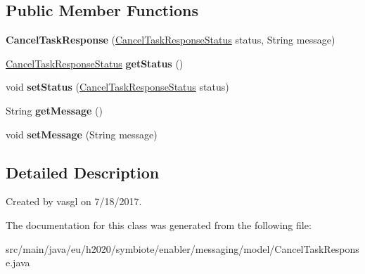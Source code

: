 \subsection*{Public Member Functions}
\begin{DoxyCompactItemize}
\item 
\mbox{\label{classeu_1_1h2020_1_1symbiote_1_1enabler_1_1messaging_1_1model_1_1CancelTaskResponse_abb332532c55c9b4129d7829049bc5703}} 
{\bfseries Cancel\+Task\+Response} (\hyperlink{enumeu_1_1h2020_1_1symbiote_1_1enabler_1_1messaging_1_1model_1_1CancelTaskResponseStatus}{Cancel\+Task\+Response\+Status} status, String message)
\item 
\mbox{\label{classeu_1_1h2020_1_1symbiote_1_1enabler_1_1messaging_1_1model_1_1CancelTaskResponse_a5aeaac8821f75f9d1b198c189c856b61}} 
\hyperlink{enumeu_1_1h2020_1_1symbiote_1_1enabler_1_1messaging_1_1model_1_1CancelTaskResponseStatus}{Cancel\+Task\+Response\+Status} {\bfseries get\+Status} ()
\item 
\mbox{\label{classeu_1_1h2020_1_1symbiote_1_1enabler_1_1messaging_1_1model_1_1CancelTaskResponse_a9f870f51c6ca4183e7aa3ea3396a4f2f}} 
void {\bfseries set\+Status} (\hyperlink{enumeu_1_1h2020_1_1symbiote_1_1enabler_1_1messaging_1_1model_1_1CancelTaskResponseStatus}{Cancel\+Task\+Response\+Status} status)
\item 
\mbox{\label{classeu_1_1h2020_1_1symbiote_1_1enabler_1_1messaging_1_1model_1_1CancelTaskResponse_ad65bd43f9e6734541e4321049a09cea1}} 
String {\bfseries get\+Message} ()
\item 
\mbox{\label{classeu_1_1h2020_1_1symbiote_1_1enabler_1_1messaging_1_1model_1_1CancelTaskResponse_ab5dd39df9bed200731041a192782de89}} 
void {\bfseries set\+Message} (String message)
\end{DoxyCompactItemize}


\subsection{Detailed Description}
Created by vasgl on 7/18/2017. 

The documentation for this class was generated from the following file\+:\begin{DoxyCompactItemize}
\item 
src/main/java/eu/h2020/symbiote/enabler/messaging/model/Cancel\+Task\+Response.\+java\end{DoxyCompactItemize}
